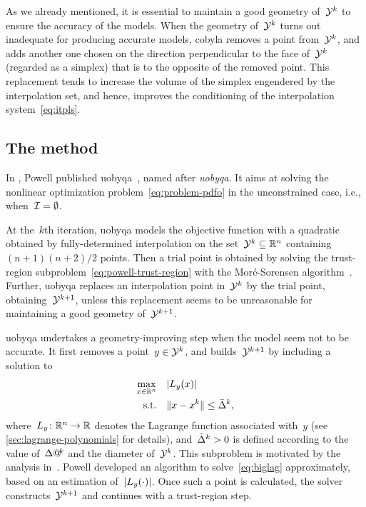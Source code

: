 As we already mentioned, it is essential to maintain a good geometry of~$\xpt[k]$ to ensure the accuracy of the models.
When the geometry of~$\xpt[k]$ turns out inadequate for producing accurate models, \gls{cobyla} removes a point from~$\xpt[k]$, and adds another one chosen on the direction perpendicular to the face of~$\xpt[k]$ (regarded as a simplex) that is to the opposite of the removed point.
This replacement tends to increase the volume of the simplex engendered by the interpolation set, and hence, improves the conditioning of the interpolation system~\cref{eq:itpls}.

\subsection{The  method}
\label{subsec:uobyqa}

In , Powell published \gls{uobyqa}~\cite{Powell_2002}, named after \emph{\glsdesc{uobyqa}}.
It aims at solving the nonlinear optimization problem~\cref{eq:problem-pdfo} in the unconstrained case, i.e., when~$\mathcal{I} = \emptyset$.

At the~$k$th iteration, \gls{uobyqa} models the objective function with a quadratic obtained by fully-determined interpolation on the set~$\xpt[k] \subseteq \R^n$ containing~$(n + 1)(n + 2) / 2$ points.
Then a trial point is obtained by solving the trust-region subproblem~\cref{eq:powell-trust-region} with the Mor{\'{e}}-Sorensen algorithm~\cite{More_Sorensen_1983}.
Further, \gls{uobyqa} replaces an interpolation point in~$\xpt[k]$ by the trial point, obtaining~$\xpt[k + 1]$, unless this replacement seems to be unreasonable for maintaining a good geometry of~$\xpt[k + 1]$.

\Gls{uobyqa} undertakes a geometry-improving step when the model seem not to be accurate.
It first removes a point~$y \in \xpt[k]$, and builds~$\xpt[k + 1]$ by including a solution to
\begin{subequations}
    \label{eq:biglag}
    \begin{align}
        \max_{x \in \R^n}   & \quad \abs{\lagp[y](x)}\\
        \text{s.t.}         & \quad \norm{x - \iter[k]} \le \bar{\rad}^k, \label{eq:biglag-tr}
    \end{align}
\end{subequations}
where~$\lagp[y] \colon \R^n \to \R$ denotes the Lagrange function associated with~$y$ (see \cref{sec:lagrange-polynomials} for details), and~$\bar{\rad}^k > 0$ is defined according to the value of~$\rad[k]$ and the diameter of~$\xpt[k]$.
This subproblem is motivated by the analysis in~\cite[\S~2]{Powell_2001}.
Powell developed an algorithm to solve~\cref{eq:biglag} approximately, based on an estimation of~$\abs{\lagp[y](\cdot)}$.
Once such a point is calculated, the solver constructs~$\xpt[k + 1]$ and continues with a trust-region step.

